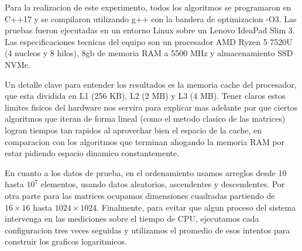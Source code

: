 Para la realizacion de este experimento, todos los algoritmos se programaron en C++17 y se compilaron utilizando g++ con la bandera de optimizacion -O3. Las pruebas fueron ejecutadas en un entorno Linux sobre un Lenovo IdeaPad Slim 3. Las especificaciones tecnicas del equipo son un procesador AMD Ryzen 5 7520U (4 nucleos y 8 hilos), 8gb de memoria RAM a 5500 MHz y almacenamiento SSD NVMe.

\medskip

Un detalle clave para entender los resultados es la memoria cache del procesador, que esta dividida en L1 (256 KB), L2 (2 MB) y L3 (4 MB). Tener claros estos limites fisicos del hardware nos servira para explicar mas adelante por que ciertos algoritmos que iteran de forma lineal (como el metodo clasico de las matrices) logran tiempos tan rapidos al aprovechar bien el espacio de la cache, en comparacion con los algoritmos que terminan ahogando la memoria RAM por estar pidiendo espacio dinamico constantemente.

\medskip

En cuanto a los datos de prueba, en el ordenamiento usamos arreglos desde 10 hasta $10^7$ elementos, usando datos aleatorios, ascendentes y descendentes. Por otra parte para las matrices ocupamos dimensiones cuadradas partiendo de $16 \times 16$ hasta $1024 \times 1024$. Finalmente, para evitar que algun proceso del sistema intervenga en las mediciones sobre el tiempo de CPU, ejecutamos cada configuracion tres veces seguidas y utilizamos el promedio de esos intentos para construir los graficos logaritmicos.
